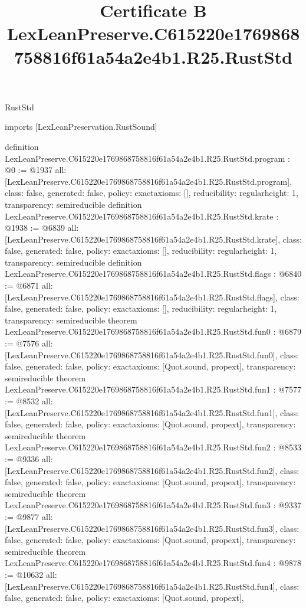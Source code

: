 \begin{lexlean}{RustStd}
\title{Certificate B LexLeanPreserve.C615220e1769868758816f61a54a2e4b1.R25.RustStd}
\begin{coremodule}
imports [LexLeanPreservation.RustSound]

definition LexLeanPreserve.C615220e1769868758816f61a54a2e4b1.R25.RustStd.program : @0 := @1937 {
  all: [LexLeanPreserve.C615220e1769868758816f61a54a2e4b1.R25.RustStd.program],
  class: false,
  generated: false,
  policy: exact{axioms: []},
  reducibility: regular{height: 1},
  transparency: semireducible
}
definition LexLeanPreserve.C615220e1769868758816f61a54a2e4b1.R25.RustStd.krate : @1938 := @6839 {
  all: [LexLeanPreserve.C615220e1769868758816f61a54a2e4b1.R25.RustStd.krate],
  class: false,
  generated: false,
  policy: exact{axioms: []},
  reducibility: regular{height: 1},
  transparency: semireducible
}
definition LexLeanPreserve.C615220e1769868758816f61a54a2e4b1.R25.RustStd.flags : @6840 := @6871 {
  all: [LexLeanPreserve.C615220e1769868758816f61a54a2e4b1.R25.RustStd.flags],
  class: false,
  generated: false,
  policy: exact{axioms: []},
  reducibility: regular{height: 1},
  transparency: semireducible
}
theorem LexLeanPreserve.C615220e1769868758816f61a54a2e4b1.R25.RustStd.fun0 : @6879 := @7576 {
  all: [LexLeanPreserve.C615220e1769868758816f61a54a2e4b1.R25.RustStd.fun0],
  class: false,
  generated: false,
  policy: exact{axioms: [Quot.sound, propext]},
  transparency: semireducible
}
theorem LexLeanPreserve.C615220e1769868758816f61a54a2e4b1.R25.RustStd.fun1 : @7577 := @8532 {
  all: [LexLeanPreserve.C615220e1769868758816f61a54a2e4b1.R25.RustStd.fun1],
  class: false,
  generated: false,
  policy: exact{axioms: [Quot.sound, propext]},
  transparency: semireducible
}
theorem LexLeanPreserve.C615220e1769868758816f61a54a2e4b1.R25.RustStd.fun2 : @8533 := @9336 {
  all: [LexLeanPreserve.C615220e1769868758816f61a54a2e4b1.R25.RustStd.fun2],
  class: false,
  generated: false,
  policy: exact{axioms: [Quot.sound, propext]},
  transparency: semireducible
}
theorem LexLeanPreserve.C615220e1769868758816f61a54a2e4b1.R25.RustStd.fun3 : @9337 := @9877 {
  all: [LexLeanPreserve.C615220e1769868758816f61a54a2e4b1.R25.RustStd.fun3],
  class: false,
  generated: false,
  policy: exact{axioms: [Quot.sound, propext]},
  transparency: semireducible
}
theorem LexLeanPreserve.C615220e1769868758816f61a54a2e4b1.R25.RustStd.fun4 : @9878 := @10632 {
  all: [LexLeanPreserve.C615220e1769868758816f61a54a2e4b1.R25.RustStd.fun4],
  class: false,
  generated: false,
  policy: exact{axioms: [Quot.sound, propext]},
}
\end{coremodule}
\end{lexlean}
